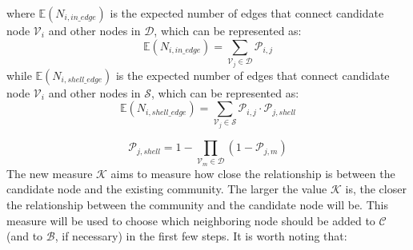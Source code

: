 \documentclass[\main/thesis.tex]{subfiles}
\begin{document}
where $\mathbb{E}(N_{i,in\_edge})$ is the expected number of edges that connect candidate node $\mathcal{V}_i$ and other nodes in $\mathcal{D}$, which can be represented as:
\begin{equation}
\mathbb{E}(N_{i,in\_edge}) = \sum_{\mathcal{V}_j\in \mathcal{D}}\mathcal{P}_{i,j}
\end{equation}
while $\mathbb{E}(N_{i,shell\_edge})$ is the expected number of edges that connect candidate node $\mathcal{V}_i$ and other nodes in $\mathcal{S}$, which can be represented as:
\begin{equation}
\mathbb{E}(N_{i,shell\_edge}) = \sum_{\mathcal{V}_j\in \mathcal{S}}\mathcal{P}_{i,j}\cdot \mathcal{P}_{j,shell}
\end{equation}

\begin{equation}
\mathcal{P}_{j,shell} = 1-\prod_{\mathcal{V}_m\in \mathcal{D}}(1-\mathcal{P}_{j,m})
\label{update-probability}
\end{equation}
The new measure $\mathcal{K}$ aims to measure how close the relationship is between the candidate node and the existing community. The larger the value $\mathcal{K}$ is, the closer the relationship between the community and the candidate node will be. This measure will be used to choose which neighboring node should be added to $\mathcal{C}$ (and to $\mathcal{B}$, if necessary) in the first few steps. 
It is worth noting that:
\end{document}
